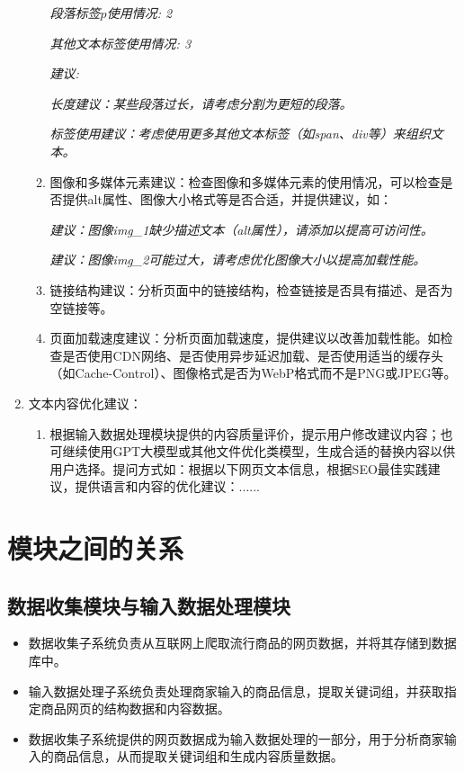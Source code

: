 \documentclass[11pt, a4paper, oneside]{ctexbook}
\begin{document}
\begin{enumerate}
\begin{enumerate}
                    \textit{段落标签\(p\)使用情况: 2}\vspace{-0.5em}

                    \textit{其他文本标签使用情况: 3}\vspace{-0.5em}

                    \textit{建议:}\vspace{-0.5em}

                    \textit{长度建议：某些段落过长，请考虑分割为更短的段落。}\vspace{-0.5em}

                    \textit{标签使用建议：考虑使用更多其他文本标签（如span、div等）来组织文本。}
              \item 图像和多媒体元素建议：检查图像和多媒体元素的使用情况，可以检查是否提供alt属性、图像大小格式等是否合适，并提供建议，如：

                    \textit{建议：图像img\_1缺少描述文本（alt属性），请添加以提高可访问性。}\vspace{-0.5em}

                    \textit{建议：图像img\_2可能过大，请考虑优化图像大小以提高加载性能。}

              \item 链接结构建议：分析页面中的链接结构，检查链接是否具有描述、是否为空链接等。
              \item 页面加载速度建议：分析页面加载速度，提供建议以改善加载性能。如检查是否使用CDN网络、是否使用异步延迟加载、是否使用适当的缓存头（如Cache-Control）、图像格式是否为WebP格式而不是PNG或JPEG等。
          \end{enumerate}
    \item 文本内容优化建议：
          \begin{enumerate}
              \item 根据输入数据处理模块提供的内容质量评价，提示用户修改建议内容；也可继续使用GPT大模型或其他文件优化类模型，生成合适的替换内容以供用户选择。提问方式如：根据以下网页文本信息，根据SEO最佳实践建议，提供语言和内容的优化建议：......
          \end{enumerate}

\end{enumerate}

\section{模块之间的关系}
\subsection{数据收集模块与输入数据处理模块}
\begin{itemize}
    \item 数据收集子系统负责从互联网上爬取流行商品的网页数据，并将其存储到数据库中。
    \item 输入数据处理子系统负责处理商家输入的商品信息，提取关键词组，并获取指定商品网页的结构数据和内容数据。
    \item 数据收集子系统提供的网页数据成为输入数据处理的一部分，用于分析商家输入的商品信息，从而提取关键词组和生成内容质量数据。
\end{itemize}
\end{document}
